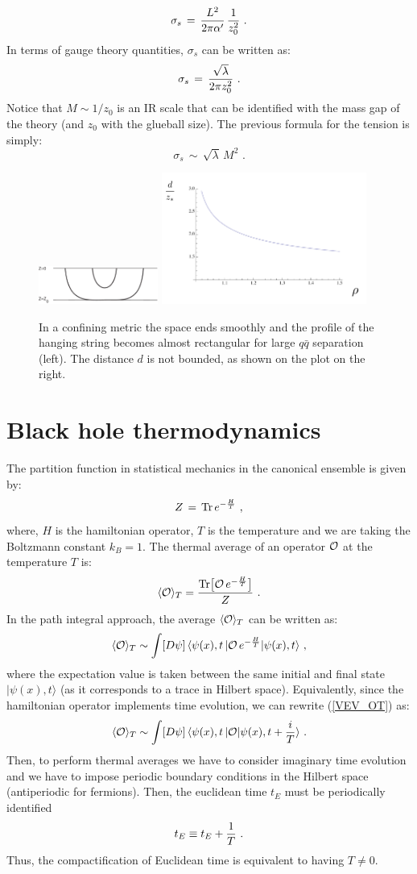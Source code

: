 \documentclass[12pt,notitlepage]{article}
\newcommand{\beq}{\begin{equation}}
\newcommand{\eeq}{\end{equation}}
\begin{document}
\beq
\sigma_s\,=\,
{L^2\over 2\pi\alpha'}\,{1\over z_0^2}\,\,.
\eeq
In terms of gauge theory quantities, $\sigma_s$ can be written as:
\beq
\sigma_s\,=\,{\sqrt{\lambda}\over 2\pi z_0^2}\,\,.
\eeq
Notice that $M\sim 1/ z_0$ is an IR scale that can be identified with  the mass gap of the theory (and $z_0$ with the glueball size). The previous formula for the tension is simply:
\beq
\sigma_s\,\sim\,\sqrt{\lambda}\,M^2\,\,.
\eeq
\begin{figure}[ht]
\center
\includegraphics[width=0.35\textwidth]{Wilsonconfining.pdf}
\includegraphics[width=0.60\textwidth]{dWL_confining.pdf}
\caption{In a confining metric the space ends smoothly and the profile of the hanging string becomes almost rectangular for large $q\bar q$ separation (left). The distance $d$  is not bounded, as shown on the plot on the right. } 
\label{Wilson_confining}
\end{figure}


\section{Black hole thermodynamics}

The partition function in statistical mechanics in the canonical ensemble is given by:
\beq
Z\,=\,{\rm Tr}\,e^{-{H\over T}}\,\,,
\eeq
where, $H$ is the hamiltonian operator,  $T$ is the temperature and we are taking the Boltzmann constant $k_B=1$.  The thermal average of an operator ${\cal O}$ at the temperature $T$ is:
\beq
\langle {\cal O}\rangle_{T}={{\rm Tr}\big[{\cal O}\,e^{-{H\over T}}\big]\over Z}\,\,.
\eeq
In the path integral approach, the average $\langle {\cal O}\rangle_{T}$ can be written as:
\beq
\langle {\cal O}\rangle_{T}\sim 
\int [D\psi] \,
\langle \psi(x), t\,| {\cal O}\,e^{-{H\over T}} |\psi(x), t\rangle\,\,,
\label{VEV_OT}
\eeq
where the expectation value is taken between the same initial and final state $ |\psi(x), t\rangle$ (as it corresponds to a trace in Hilbert space).  Equivalently, since the hamiltonian operator implements time evolution,  we can rewrite 
(\ref{VEV_OT}) as:
\beq
\langle {\cal O}\rangle_{T}\sim 
\int [D\psi] \,
\langle \psi(x), t\,| {\cal O} |\psi(x), t+{i\over T}\rangle\,\,.
\label{VEV_Thermal}
\eeq
Then, to perform thermal averages we have to consider imaginary time evolution and we have to impose periodic boundary conditions in the Hilbert space (antiperiodic for fermions). Then, the euclidean time $t_E$ must be periodically identified
\beq
t_E\equiv t_E+{1\over T}\,\,.
\eeq
Thus, the  compactification of Euclidean time is equivalent to having $T\not=0$. 
\end{document}
